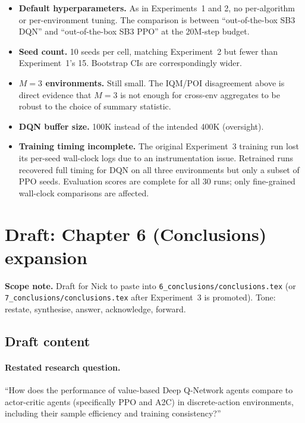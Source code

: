 \documentclass[11pt,a4paper]{article}
\newcommand{\fileline}[1]{\texttt{\small #1}}
\begin{document}
\begin{itemize}[leftmargin=*]
  \item \textbf{Default hyperparameters.} As in Experiments~1 and 2,
  no per-algorithm or per-environment tuning. The comparison is
  between ``out-of-the-box SB3 DQN'' and ``out-of-the-box SB3 PPO'' at
  the 20M-step budget.
  \item \textbf{Seed count.} 10 seeds per cell, matching
  Experiment~2 but fewer than Experiment~1's 15. Bootstrap CIs are
  correspondingly wider.
  \item \textbf{$M=3$ environments.} Still small. The IQM/POI
  disagreement above is direct evidence that $M=3$ is not enough for
  cross-env aggregates to be robust to the choice of summary
  statistic.
  \item \textbf{DQN buffer size.} 100K instead of the intended 400K
  (oversight).
  \item \textbf{Training timing incomplete.} The original Experiment~3
  training run lost its per-seed wall-clock logs due to an
  instrumentation issue. Retrained runs recovered full timing for DQN
  on all three environments but only a subset of PPO seeds. Evaluation
  scores are complete for all 30 runs; only fine-grained wall-clock
  comparisons are affected.
\end{itemize}

\section{Draft: Chapter 6 (Conclusions) expansion}\label{sec:conclusions}

\textbf{Scope note.} Draft for Nick to paste into
\fileline{6\_conclusions/conclusions.tex} (or
\fileline{7\_conclusions/conclusions.tex} after Experiment~3 is
promoted). Tone: restate, synthesise, answer, acknowledge, forward.

\subsection*{Draft content}

\paragraph{Restated research question.}
``How does the performance of value-based Deep Q-Network agents compare
to actor-critic agents (specifically PPO and A2C) in discrete-action
environments, including their sample efficiency and training
consistency?''
\end{document}
